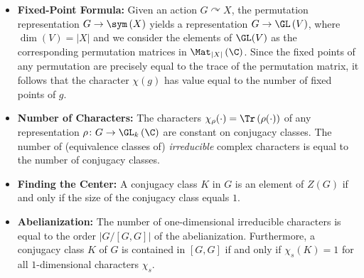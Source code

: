 \documentclass[10pt]{mypackage}
\begin{document}
\begin{itemize}
    The character of the tensor product representation is given by $\chi_{\rho_1\otimes \rho_2} = \chi_{\rho_1}\chi_{\rho_2}$.
  \item \textbf{Fixed-Point Formula:} Given an action $G\curvearrowright X$, the permutation representation $G\rightarrow \sym\left( X \right)$ yields a representation $G\rightarrow \GL\left( V \right)$, where $\dim\left( V \right) = \left\vert X \right\vert$ and we consider the elements of $\GL(V)$ as the corresponding permutation matrices in $\Mat_{\left\vert X \right\vert}\left( \C \right)$. Since the fixed points of any permutation are precisely equal to the trace of the permutation matrix, it follows that the character $\chi(g)$ has value equal to the number of fixed points of $g$.
  \item \textbf{Number of Characters:} The characters $\chi_{\rho}(\cdot) = \Tr\left( \rho(\cdot) \right)$ of any representation $\rho\colon G\rightarrow \GL_k\left(\C\right)$ are constant on conjugacy classes. The number of (equivalence classes of) \textit{irreducible} complex characters is equal to the number of conjugacy classes.
  \item \textbf{Finding the Center:} A conjugacy class $K$ in $G$ is an element of $Z(G)$ if and only if the size of the conjugacy class equals $1$.
  \item \textbf{Abelianization:} The number of one-dimensional irreducible characters is equal to the order $\left\vert G/\left[ G,G \right] \right\vert$ of the abelianization. Furthermore, a conjugacy class $K$ of $G$ is contained in $\left[ G,G \right]$ if and only if $\chi_{s}\left(K\right) = 1$ for all $1$-dimensional characters $\chi_s$.


\end{itemize}
\end{document}
